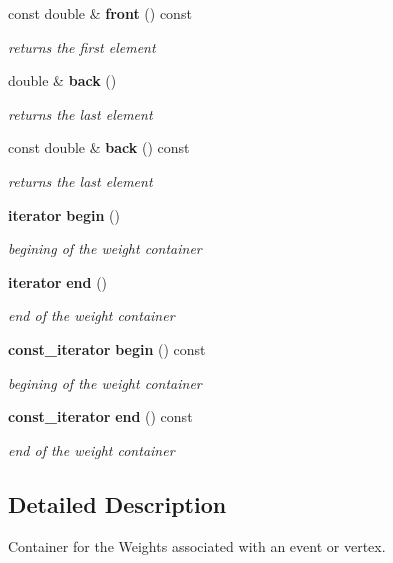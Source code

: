 \begin{CompactItemize}
const double \& {\bf front} () const
\begin{CompactList}\small\item\em returns the first element \item\end{CompactList}\item 
double \& {\bf back} ()
\begin{CompactList}\small\item\em returns the last element \item\end{CompactList}\item 
const double \& {\bf back} () const
\begin{CompactList}\small\item\em returns the last element \item\end{CompactList}\item 
{\bf iterator} {\bf begin} ()
\begin{CompactList}\small\item\em begining of the weight container \item\end{CompactList}\item 
{\bf iterator} {\bf end} ()
\begin{CompactList}\small\item\em end of the weight container \item\end{CompactList}\item 
{\bf const\_\-iterator} {\bf begin} () const
\begin{CompactList}\small\item\em begining of the weight container \item\end{CompactList}\item 
{\bf const\_\-iterator} {\bf end} () const
\begin{CompactList}\small\item\em end of the weight container \item\end{CompactList}\end{CompactItemize}


\subsection{Detailed Description}
Container for the Weights associated with an event or vertex. 

